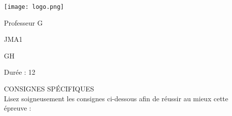 \documentclass{book}%
\begin{document}
%
\normalsize%
\newpage%
\thispagestyle{empty}%
\vskip-40mm	\texttt{[image: logo.png]} \\%
 \begin{flushright}  \vskip-20mm   Professeur G\vskip15mm  \end{flushright}%
JMA1%
\begin{center}   \begin{Large}GH\end{Large} \end{center}%
Durée : 12%
 \begin{center} { \large CONSIGNES SPÉCIFIQUES } \\ Lisez soigneusement les consignes ci-dessous afin de réussir au mieux cette épreuve : \end{center} %
\end{document}
